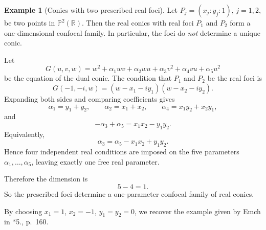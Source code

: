 \documentclass[11pt]{amsart}
\theoremstyle{definition}
\newtheorem{example}[lemma]{Example}
\theoremstyle{remark}
\newcommand{\bR}{\mathbb{R}}
\newcommand{\bP}{\mathbb{P}}
\begin{document}
\begin{example}[Conics with two prescribed real foci]
Let $P_j=(x_j:y_j:1)$, $j=1,2$, be two points in $\bP^2(\bR)$. Then the real conics with
real foci $P_1$ and $P_2$ form a one-dimensional confocal family. In particular, the foci
do \emph{not} determine a unique conic.

Let
\[
G(u,v,w)=w^2+\alpha_1wv+\alpha_2wu+\alpha_3v^2+\alpha_4vu+\alpha_5u^2
\]
be the equation of the dual conic. The condition that $P_1$ and $P_2$ be the real foci is
\[
G(-1,-i,w)=(w-x_1-iy_1)(w-x_2-iy_2).
\]
Expanding both sides and comparing coefficients gives
\[
\alpha_1=y_1+y_2,\qquad
\alpha_2=x_1+x_2,\qquad
\alpha_4=x_1y_2+x_2y_1,
\]
and
\[
-\alpha_3+\alpha_5=x_1x_2-y_1y_2.
\]
Equivalently,
\[
\alpha_3=\alpha_5-x_1x_2+y_1y_2.
\]
Hence four independent real conditions are imposed on the five parameters
$\alpha_1,\dots,\alpha_5$, leaving exactly one free real parameter.

Therefore the dimension is
\[
5-4=1.
\]
So the prescribed foci determine a one-parameter confocal family of real conics.

By choosing $x_1=1$, $x_2=-1$, $y_1=y_2=0$, we recover the example given by Emch in
\cite{Emch}*{5., p.~160}.
\end{example}
\end{document}
